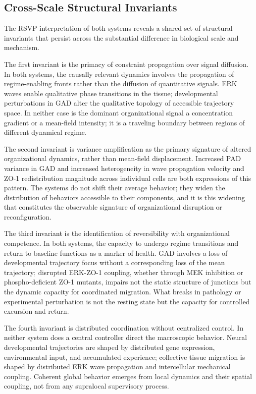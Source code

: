 \documentclass[11pt,a4paper]{article}
\theoremstyle{plain}
\theoremstyle{definition}
\begin{document}
\subsection{Cross-Scale Structural Invariants}

The RSVP interpretation of both systems reveals a shared set of structural invariants
that persist across the substantial difference in biological scale and mechanism.

The first invariant is the primacy of constraint propagation over signal diffusion.
In both systems, the causally relevant dynamics involves the propagation of regime-enabling
fronts rather than the diffusion of quantitative signals. ERK waves enable qualitative
phase transitions in the tissue; developmental perturbations in GAD alter the qualitative
topology of accessible trajectory space. In neither case is the dominant organizational
signal a concentration gradient or a mean-field intensity; it is a traveling boundary
between regions of different dynamical regime.

The second invariant is variance amplification as the primary signature of altered
organizational dynamics, rather than mean-field displacement. Increased PAD variance in
GAD and increased heterogeneity in wave propagation velocity and ZO-1 redistribution
magnitude across individual cells are both expressions of this pattern. The systems do
not shift their average behavior; they widen the distribution of behaviors accessible
to their components, and it is this widening that constitutes the observable signature
of organizational disruption or reconfiguration.

The third invariant is the identification of reversibility with organizational competence.
In both systems, the capacity to undergo regime transitions and return to baseline
functions as a marker of health. GAD involves a loss of developmental trajectory focus
without a corresponding loss of the mean trajectory; disrupted ERK-ZO-1 coupling,
whether through MEK inhibition or phospho-deficient ZO-1 mutants, impairs not the static
structure of junctions but the dynamic capacity for coordinated migration. What breaks
in pathology or experimental perturbation is not the resting state but the capacity
for controlled excursion and return.

The fourth invariant is distributed coordination without centralized control. In neither
system does a central controller direct the macroscopic behavior. Neural developmental
trajectories are shaped by distributed gene expression, environmental input, and
accumulated experience; collective tissue migration is shaped by distributed ERK wave
propagation and intercellular mechanical coupling. Coherent global behavior emerges
from local dynamics and their spatial coupling, not from any supralocal supervisory process.
\end{document}
